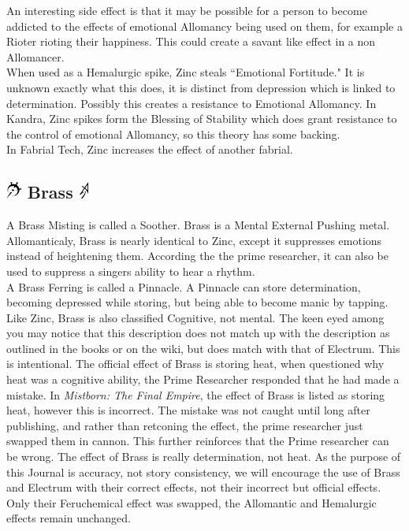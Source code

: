 \documentclass[conference]{IEEEtran}
\begin{document}
An interesting side effect is that it may be possible for a person to become addicted to the effects of emotional Allomancy being used on them, for example a Rioter rioting their happiness.  This could create a savant like effect in a non Allomancer. \\

When used as a Hemalurgic spike, Zinc steals ``Emotional Fortitude." It is unknown exactly what this does, it is distinct from depression which is linked to determination.  Possibly this creates a resistance to Emotional Allomancy.  In Kandra, Zinc spikes form the Blessing of Stability which does grant resistance to the control of emotional Allomancy, so this theory has some backing.\\

In Fabrial Tech, Zinc increases the effect of another fabrial. 

\subsection*{\includegraphics[height=1em]{images/Brass.png}  Brass \includegraphics[height=1em]{images/Brass_(Feruchemy).png}}
A Brass Misting is called a Soother.  Brass is a Mental External Pushing metal.  Allomanticaly, Brass is nearly identical to Zinc, except it suppresses emotions instead of heightening them.  
According the the prime researcher, it can also be used to suppress a singers ability to hear a rhythm.\\

A Brass Ferring is called a Pinnacle.  A Pinnacle can store determination, becoming depressed while storing, but being able to become manic by tapping.  Like Zinc, Brass is also classified Cognitive, not mental.  
The keen eyed among you may notice that this description does not match up with the description as outlined in the books or on the wiki, but does match with that of Electrum.  This is intentional.  The official effect of Brass is storing heat, when questioned why heat was a cognitive ability, the Prime Researcher responded that he had made a mistake.  In \textit{Mistborn: The Final Empire}, the effect of Brass is listed as storing heat, however this is incorrect.  The mistake was not caught until long after publishing, and rather than retconing the effect, the prime researcher just swapped them in cannon.  This further reinforces that the Prime researcher can be wrong.  The effect of Brass is really determination, not heat.  As the purpose of this Journal is accuracy, not story consistency, we will encourage the use of Brass and Electrum with their correct effects, not their incorrect but official effects.  Only their Feruchemical effect was swapped, the Allomantic and Hemalurgic effects remain unchanged.\\
\end{document}
